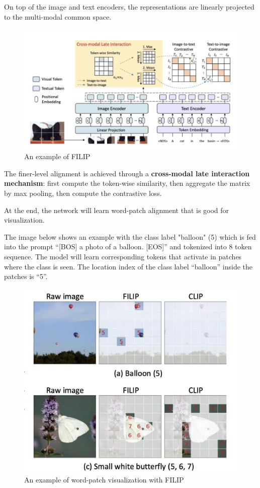 On top of the image and text encoders, the
representations are linearly projected to the
multi-modal common space.

\begin{figure}[H]
    \centering
    \includegraphics[width=1\linewidth]{tikz/FILIP.png}
    \caption{An example of FILIP}
    \label{fig:FILIP}
\end{figure}

The finer-level alignment is achieved through a \textbf{cross-modal late interaction
mechanism}: first compute the token-wise similarity, then aggregate the matrix by max pooling, then compute the contrastive loss.



At the end, the network will learn word-patch alignment that is good for visualization.

The image below shows an example with the class label "balloon" (5) which is fed into the prompt “[BOS] a photo of a balloon. [EOS]” and tokenized into  8 token sequence. The model will learn corresponding tokens that activate in patches where the class is seen. The location index of the class label “balloon” inside the patches is “5”.

\begin{figure}[H]
    \centering
    \includegraphics[width=1\linewidth]{tikz/FILIP visualization.png}
    \caption{An example of word-patch visualization with FILIP}
    \label{fig:FILIP-visualization}
\end{figure}



